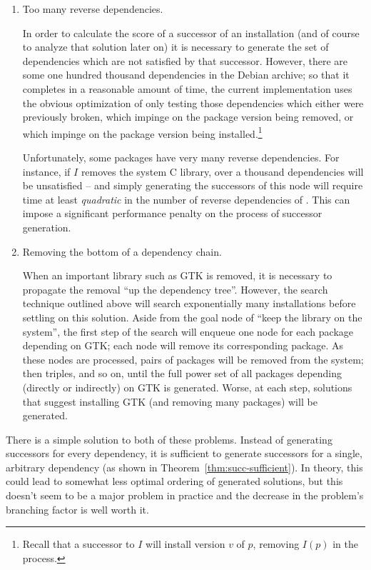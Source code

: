 \documentclass[letterpaper]{article}
\theoremstyle{definition}
\theoremstyle{remark}
\newcommand{\pkg}[1]{\text{\url{#1}}}
\begin{document}
\begin{enumerate}
\item Too many reverse dependencies.

  In order to calculate the score of a successor of an installation
  (and of course to analyze that solution later on) it is necessary to
  generate the set of dependencies which are not satisfied by that
  successor.  However, there are some one hundred thousand
  dependencies in the Debian archive; so that it completes in a
  reasonable amount of time, the current implementation uses the
  obvious optimization of only testing those dependencies which either
  were previously broken, which impinge on the package version being
  removed, or which impinge on the package version being
  installed.\footnote{Recall that a successor to $I$ will install
    version $v$ of $p$, removing $I(p)$ in the process.}

  Unfortunately, some packages have very many reverse dependencies.
  For instance, if $I$ removes the system C library, over a thousand
  dependencies will be unsatisfied -- and simply generating the
  successors of this node will require time at least \emph{quadratic}
  in the number of reverse dependencies of \pkg{libc}.  This can
  impose a significant performance penalty on the process of successor
  generation.

\item Removing the bottom of a dependency chain.

  When an important library such as GTK is removed, it is necessary to
  propagate the removal ``up the dependency tree''.  However, the
  search technique outlined above will search exponentially many
  installations before settling on this solution.  Aside from the goal
  node of ``keep the library on the system'', the first step of the
  search will enqueue one node for each package depending on GTK; each
  node will remove its corresponding package.  As these nodes are
  processed, pairs of packages will be removed from the system; then
  triples, and so on, until the full power set of all packages
  depending (directly or indirectly) on GTK is generated.  Worse, at
  each step, solutions that suggest installing GTK (and removing many
  packages) will be generated.
\end{enumerate}

There is a simple solution to both of these problems.  Instead of
generating successors for every dependency, it is sufficient to
generate successors for a single, arbitrary dependency (as shown in
Theorem~\ref{thm:succ-sufficient}).  In theory, this could lead to
somewhat less optimal ordering of generated solutions, but this
doesn't seem to be a major problem in practice and the decrease in the
problem's branching factor is well worth it.
\end{document}
